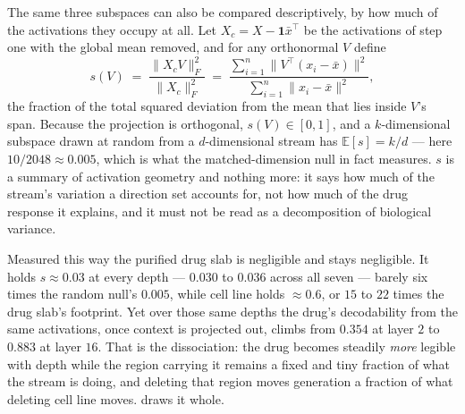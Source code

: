 The same three subspaces can also be compared descriptively, by how much of the
activations they occupy at all. Let $X_c = X - \mathbf{1}\bar{x}^{\top}$ be the
activations of step one with the global mean removed, and for any orthonormal
$V$ define
\begin{equation}
  s(V) \;=\;
    \frac{\lVert X_c V \rVert_F^{2}}{\lVert X_c \rVert_F^{2}}
  \;=\; \frac{\sum_{i=1}^{n} \lVert V^{\top}(x_i - \bar{x}) \rVert^{2}}
             {\sum_{i=1}^{n} \lVert x_i - \bar{x} \rVert^{2}} ,
\end{equation}
the fraction of the total squared deviation from the mean that lies inside
$V$'s span. Because the projection is orthogonal, $s(V) \in [0,1]$, and a
$k$-dimensional subspace drawn at random from a $d$-dimensional stream has
$\mathbb{E}[s] = k/d$ --- here $10/2048 \approx 0.005$, which is what the
matched-dimension null in fact measures. $s$ is a summary of activation
geometry and nothing more: it says how much of the stream's variation a
direction set accounts for, not how much of the drug response it explains, and
it must not be read as a decomposition of biological variance.

Measured this way the purified drug slab is negligible and stays negligible.
It holds $s \approx 0.03$ at every depth --- $0.030$ to $0.036$ across all seven
--- barely six times the random null's $0.005$, while cell line holds
$\approx 0.6$, or $15$ to $22$ times the drug slab's footprint. Yet over those
same depths the drug's decodability from the same activations, once context is
projected out, climbs from $0.354$ at layer $2$ to $0.883$ at layer $16$. That
is the dissociation: the drug becomes steadily \emph{more} legible with depth
while the region carrying it remains a fixed and tiny fraction of what the
stream is doing, and deleting that region moves generation a fraction of what
deleting cell line moves.  draws it whole.



